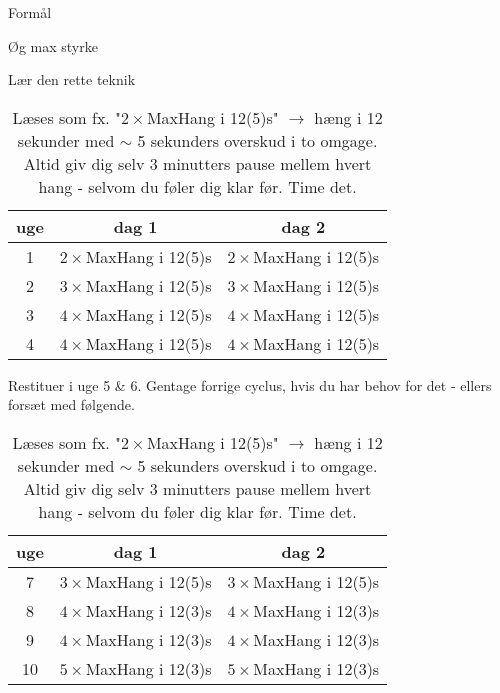 \begin{tList}{Form\aa l}
\item \O g max styrke 
\item L\ae r den rette teknik
\end{tList}




\begin{table}[h!]
\centering
\begin{tabular}{c| c c}
\textbf{uge} & \textbf{dag 1} & \textbf{dag 2} \\ \hline
1 & $2\times$MaxHang i 12(5)s & $2\times$MaxHang i 12(5)s \\
2 & $3\times$MaxHang i 12(5)s & $3\times$MaxHang i 12(5)s \\
3 & $4\times$MaxHang i 12(5)s & $4\times$MaxHang i 12(5)s \\
4 & $4\times$MaxHang i 12(5)s & $4\times$MaxHang i 12(5)s \\
\end{tabular}

\vspace{1em}
\raggedright

Restituer i uge 5 {\&} 6. Gentage forrige cyclus, hvis du har behov for det - 
ellers fors\ae t med f\o lgende.

\centering
\begin{tabular}{c| c c}
\textbf{uge} & \textbf{dag 1} & \textbf{dag 2} \\ \hline
7 & $3\times$MaxHang i 12(5)s & $3\times$MaxHang i 12(5)s \\
8 & $4\times$MaxHang i 12(3)s & $4\times$MaxHang i 12(3)s \\
9 & $4\times$MaxHang i 12(3)s & $4\times$MaxHang i 12(3)s \\
10 & $5\times$MaxHang i 12(3)s & $5\times$MaxHang i 12(3)s \\
\end{tabular}
\caption{L\ae ses som fx. "$2\times$MaxHang i 12(5)s" $\rightarrow$ h\ae ng i 12 sekunder med $\sim$ 5 sekunders overskud i to omgage.
Altid giv dig selv 3 minutters pause mellem hvert hang - selvom du
f\o ler dig klar f\o r. Time det.}
\end{table}



